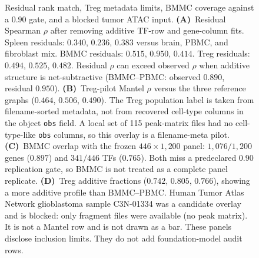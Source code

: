 \documentclass[fleqn,10pt,lineno]{wlpeerj}
\newcommand{\fitfig}[1]{\resizebox{\ifdim\width>\linewidth\linewidth\else\width\fi}{!}{#1}}
\begin{document}
\begin{figure}[!htbp]
\centering
\fitfig{}
\caption{Residual rank match, Treg metadata limits, BMMC coverage against a $0.90$ gate, and a
blocked tumor ATAC input.
\textbf{(A)}~Residual Spearman $\rho$ after removing additive TF-row and gene-column fits. Spleen
residuals: $0.340$, $0.236$, $0.383$ versus brain, PBMC, and fibroblast mix. BMMC residuals:
$0.515$, $0.950$, $0.414$. Treg residuals: $0.494$, $0.525$, $0.482$. Residual $\rho$ can exceed
observed $\rho$ when additive structure is net-subtractive (BMMC--PBMC: observed $0.890$, residual
$0.950$).
\textbf{(B)}~Treg-pilot Mantel $\rho$ versus the three reference graphs ($0.464$, $0.506$, $0.490$).
The Treg population label is taken from filename-sorted metadata, not from recovered cell-type
columns in the object \texttt{obs} field. A local set of 115 peak-matrix files had no cell-type-like
\texttt{obs} columns, so this overlay is a filename-meta pilot.
\textbf{(C)}~BMMC overlap with the frozen $446\times 1{,}200$ panel: $1{,}076/1{,}200$ genes
($0.897$) and $341/446$ TFs ($0.765$). Both miss a predeclared $0.90$ replication gate, so BMMC is
not treated as a complete panel replicate.
\textbf{(D)}~Treg additive fractions ($0.742$, $0.805$, $0.766$), showing a more additive profile
than BMMC--PBMC.
Human Tumor Atlas Network glioblastoma sample C3N-01334 was a candidate overlay and is blocked: only
fragment files were available (no peak matrix). It is not a Mantel row and is not drawn as a bar.
These panels disclose inclusion limits. They do not add foundation-model audit rows.}
\label{fig:app-coverage}
\end{figure}

\enlargethispage{3\baselineskip}%

\end{document}
